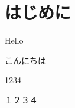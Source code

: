 \documentclass[../../../main]{subfiles}
\begin{document}
\section{はじめに}

Hello

こんにちは

1234

１２３４
\end{document}
